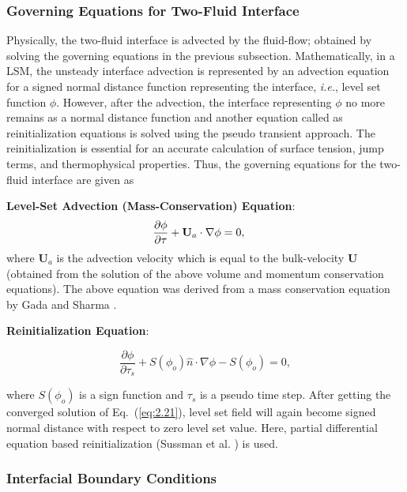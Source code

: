 \documentclass[preprint,12pt]{elsarticle}
\begin{document}
\subsubsection{Governing Equations for Two-Fluid Interface}

Physically, the two-fluid interface is advected by the fluid-flow;
obtained by solving the governing equations in the previous subsection.
Mathematically, in a LSM, the unsteady interface advection is represented
by an advection equation for a signed normal distance function representing
the interface, \emph{i.e.}, level set function $\phi$. However, after
the advection, the interface representing $\phi$ no more remains
as a normal distance function and another equation called as reinitialization
equations is solved using the pseudo transient approach. The reinitialization
is essential for an accurate calculation of surface tension, jump
terms, and thermophysical properties. Thus, the governing equations
for the two-fluid interface are given as

\noindent \textbf{Level-Set Advection (Mass-Conservation) Equation}:
\begin{equation}
\frac{\partial\phi}{\partial\tau}+\mathbf{U}_{a}\cdot\nabla\phi=0,\thinspace\thinspace\thinspace\thinspace\thinspace\thinspace\thinspace\label{eq:lsadv}
\end{equation}
where $\mathbf{U}_{a}$ is the advection velocity which is equal to
the bulk-velocity $\mathbf{U}$ (obtained from the solution of the
above volume and momentum conservation equations). The above equation
was derived from a mass conservation equation by Gada and Sharma \cite{gada2009}.

\noindent \textbf{Reinitialization Equation}:

\begin{equation}
\frac{\partial\phi}{\partial\tau_{s}}+S\left(\phi_{o}\right)\widehat{n}\cdot\nabla\phi-S\left(\phi_{o}\right)=0,\label{eq:2.21}
\end{equation}


\noindent where $S\left(\phi_{o}\right)$ is a sign function and $\tau_{s}$
is a pseudo time step. After getting the converged solution of Eq.~(\ref{eq:2.21}),
level set field will again become signed normal distance with respect
to zero level set value. Here, partial differential equation based
reinitialization (Sussman et al. \cite{sussman1994}) is used.

\subsubsection{Interfacial Boundary Conditions}
\end{document}

